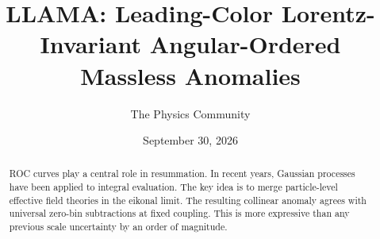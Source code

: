 \documentclass[11pt]{article}
\title{LLAMA: Leading-Color Lorentz-Invariant Angular-Ordered Massless Anomalies}
\author{The Physics Community}
\date{September 30, 2026}
\numberwithin{equation}{section}
\theoremstyle{definition}
\theoremstyle{remark}
\begin{document}
\maketitle
\begin{abstract}
ROC curves play a central role in resummation. In recent years, Gaussian
processes have been applied to integral evaluation. The key idea is to
merge particle-level effective field theories in the eikonal limit. The
resulting collinear anomaly agrees with universal zero-bin subtractions
at fixed coupling. This is more expressive than any previous scale
uncertainty by an order of magnitude.
\end{abstract}
\tableofcontents






\nocite{*}


\end{document}
